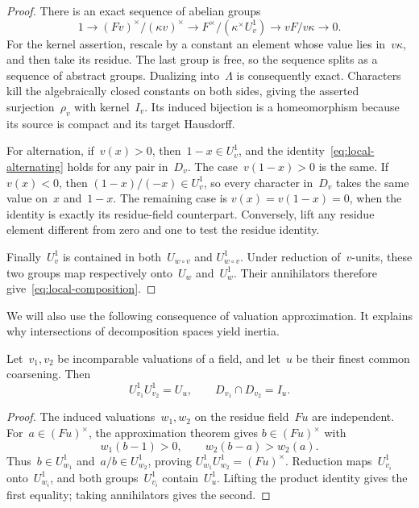\begin{proof}
There is an exact sequence of abelian groups
\[
 1\longrightarrow (Fv)^\times/(\kappa v)^\times
 \longrightarrow F^\times/(\kappa^\times U_v^1)
 \longrightarrow vF/v\kappa\longrightarrow0.
\]
For the kernel assertion, rescale by a constant an element whose value
lies in~\(v\kappa\), and then take its residue.  The last group is free,
so the sequence splits as a sequence of abstract groups.  Dualizing
into~\(\Lambda\) is consequently exact.  Characters kill the
algebraically closed constants on both sides, giving the asserted
surjection~\(\rho_v\) with kernel~\(I_v\).  Its induced bijection is a
homeomorphism because its source is compact and its target Hausdorff.

For alternation, if~\(v(x)>0\), then~\(1-x\in U_v^1\), and the
identity~\eqref{eq:local-alternating} holds for any pair in~\(D_v\).
The case~\(v(1-x)>0\) is the same.  If~\(v(x)<0\), then
\((1-x)/(-x)\in U_v^1\), so every character in~\(D_v\) takes the same
value on~\(x\) and~\(1-x\).  The remaining case is
\(v(x)=v(1-x)=0\), when the identity is exactly its residue-field
counterpart.  Conversely, lift any residue element different from
zero and one to test the residue identity.

Finally~\(U_v^1\) is contained in both~\(U_{w\circ v}\) and
\(U_{w\circ v}^1\).  Under reduction of~\(v\)-units, these two groups
map respectively onto~\(U_w\) and~\(U_w^1\).  Their annihilators
therefore give~\eqref{eq:local-composition}.
\end{proof}

We will also use the following consequence of valuation approximation.
It explains why intersections of decomposition spaces yield inertia.

\begin{lemma}
\label{lem:local-approximation}
Let~\(v_1,v_2\) be incomparable valuations of a field, and let~\(u\)
be their finest common coarsening.  Then
\[
 U_{v_1}^1U_{v_2}^1=U_u,
 \qquad D_{v_1}\cap D_{v_2}=I_u.
\]
\end{lemma}

\begin{proof}
The induced valuations~\(w_1,w_2\) on the residue field~\(Fu\) are
independent.  For~\(a\in(Fu)^\times\), the approximation theorem gives
\(b\in(Fu)^\times\) with
\[
 w_1(b-1)>0,\qquad w_2(b-a)>w_2(a).
\]
Thus~\(b\in U_{w_1}^1\) and~\(a/b\in U_{w_2}^1\), proving
\(U_{w_1}^1U_{w_2}^1=(Fu)^\times\).  Reduction maps~\(U_{v_i}^1\)
onto~\(U_{w_i}^1\), and both groups~\(U_{v_i}^1\) contain~\(U_u^1\).
Lifting the product identity gives the first equality; taking
annihilators gives the second.
\end{proof}

